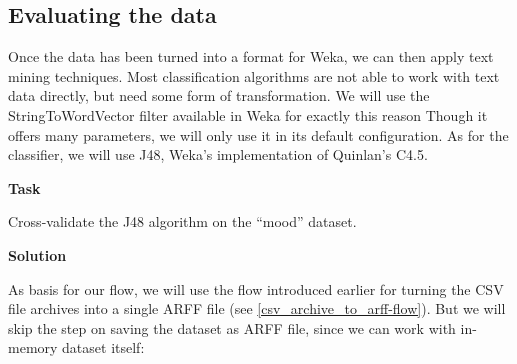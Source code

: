 \documentclass[a4paper,10pt]{book}
\newcommand{\heading}[1]{
  \vspace{0.3cm} \noindent \textbf{#1} \newline
}
\begin{document}
\subsection{Evaluating the data}
Once the data has been turned into a format for Weka, we can then apply text mining techniques. Most classification algorithms are not able to work with text data directly, but need some form of transformation. We will use the StringToWordVector filter available in Weka for exactly this reason Though it offers many parameters, we will only use it in its default configuration. As for the classifier, we will use J48, Weka's implementation of Quinlan's C4.5\cite{c45}.

\heading{Task}
Cross-validate the J48 algorithm on the ``mood'' dataset.

\heading{Solution}
As basis for our flow, we will use the flow introduced earlier for turning the CSV file archives into a single ARFF file (see \ref{csv_archive_to_arff-flow}). But we will skip the step on saving the dataset as ARFF file, since we can work with in-memory dataset itself:
\end{document}
